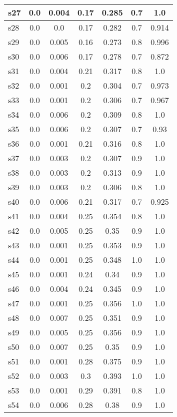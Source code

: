 \documentclass{article}
\begin{document}
\begin{tabular}{|l|c|c|c|c|c|c|}
\hline
s27 &0.0 & 0.004 & 0.17 & 0.285 & 0.7 & 1.0\\
\hline
s28 &0.0 & 0.0 & 0.17 & 0.282 & 0.7 & 0.914\\
\hline
s29 &0.0 & 0.005 & 0.16 & 0.273 & 0.8 & 0.996\\
\hline
s30 &0.0 & 0.006 & 0.17 & 0.278 & 0.7 & 0.872\\
\hline
s31 &0.0 & 0.004 & 0.21 & 0.317 & 0.8 & 1.0\\
\hline
s32 &0.0 & 0.001 & 0.2 & 0.304 & 0.7 & 0.973\\
\hline
s33 &0.0 & 0.001 & 0.2 & 0.306 & 0.7 & 0.967\\
\hline
s34 &0.0 & 0.006 & 0.2 & 0.309 & 0.8 & 1.0\\
\hline
s35 &0.0 & 0.006 & 0.2 & 0.307 & 0.7 & 0.93\\
\hline
s36 &0.0 & 0.001 & 0.21 & 0.316 & 0.8 & 1.0\\
\hline
s37 &0.0 & 0.003 & 0.2 & 0.307 & 0.9 & 1.0\\
\hline
s38 &0.0 & 0.003 & 0.2 & 0.313 & 0.9 & 1.0\\
\hline
s39 &0.0 & 0.003 & 0.2 & 0.306 & 0.8 & 1.0\\
\hline
s40 &0.0 & 0.006 & 0.21 & 0.317 & 0.7 & 0.925\\
\hline
s41 &0.0 & 0.004 & 0.25 & 0.354 & 0.8 & 1.0\\
\hline
s42 &0.0 & 0.005 & 0.25 & 0.35 & 0.9 & 1.0\\
\hline
s43 &0.0 & 0.001 & 0.25 & 0.353 & 0.9 & 1.0\\
\hline
s44 &0.0 & 0.001 & 0.25 & 0.348 & 1.0 & 1.0\\
\hline
s45 &0.0 & 0.001 & 0.24 & 0.34 & 0.9 & 1.0\\
\hline
s46 &0.0 & 0.004 & 0.24 & 0.345 & 0.9 & 1.0\\
\hline
s47 &0.0 & 0.001 & 0.25 & 0.356 & 1.0 & 1.0\\
\hline
s48 &0.0 & 0.007 & 0.25 & 0.351 & 0.9 & 1.0\\
\hline
s49 &0.0 & 0.005 & 0.25 & 0.356 & 0.9 & 1.0\\
\hline
s50 &0.0 & 0.007 & 0.25 & 0.35 & 0.9 & 1.0\\
\hline
s51 &0.0 & 0.001 & 0.28 & 0.375 & 0.9 & 1.0\\
\hline
s52 &0.0 & 0.003 & 0.3 & 0.393 & 1.0 & 1.0\\
\hline
s53 &0.0 & 0.001 & 0.29 & 0.391 & 0.8 & 1.0\\
\hline
s54 &0.0 & 0.006 & 0.28 & 0.38 & 0.9 & 1.0\\

\end{tabular}
\end{document}
